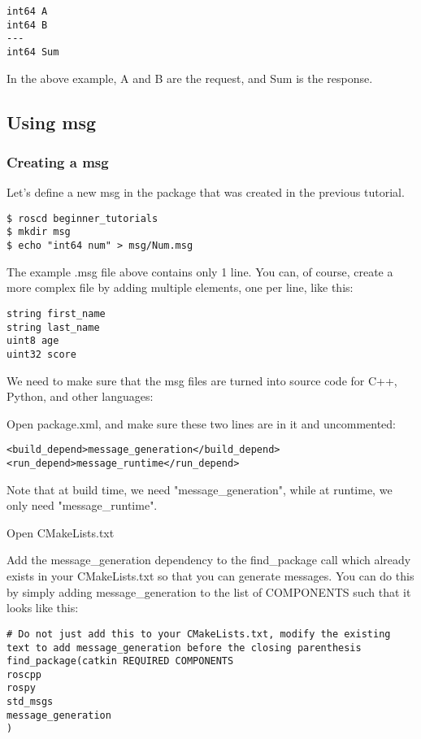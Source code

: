 \begin{lstlisting}[breaklines=true languages=bash]
int64 A
int64 B
---
int64 Sum
\end{lstlisting}

In the above example, A and B are the request, and Sum is the response.

\subsection{Using msg}

\subsubsection{Creating a msg}
Let's define a new msg in the package that was created in the previous tutorial.
\begin{lstlisting}[breaklines=true languages=bash]
$ roscd beginner_tutorials
$ mkdir msg
$ echo "int64 num" > msg/Num.msg
\end{lstlisting}

The example .msg file above contains only 1 line. You can, of course, create a more complex file by adding multiple elements, one per line, like this:

\begin{lstlisting}[breaklines=true languages=bash]
string first_name
string last_name
uint8 age
uint32 score
\end{lstlisting}

We need to make sure that the msg files are turned into source code for C++, Python, and other languages:

Open package.xml, and make sure these two lines are in it and uncommented:

\begin{lstlisting}[breaklines=true languages=bash]
<build_depend>message_generation</build_depend>
<run_depend>message_runtime</run_depend>
\end{lstlisting}

Note that at build time, we need "message\_generation", while at runtime, we only need "message\_runtime".

Open CMakeLists.txt

Add the message\_generation dependency to the find\_package call which already exists in your CMakeLists.txt so that you can generate messages. You can do this by simply adding message\_generation to the list of COMPONENTS such that it looks like this:

\begin{lstlisting}[breaklines=true languages=bash]
# Do not just add this to your CMakeLists.txt, modify the existing text to add message_generation before the closing parenthesis
find_package(catkin REQUIRED COMPONENTS
roscpp
rospy
std_msgs
message_generation
)
\end{lstlisting}

